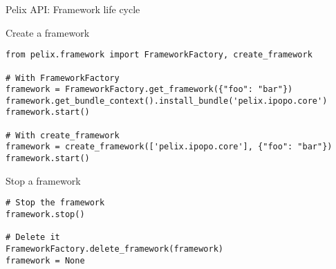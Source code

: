 \begin{frame}[fragile]{Pelix API: Framework life cycle}
\begin{block}{Create a framework}
\begin{verbatim}
from pelix.framework import FrameworkFactory, create_framework

# With FrameworkFactory
framework = FrameworkFactory.get_framework({"foo": "bar"})
framework.get_bundle_context().install_bundle('pelix.ipopo.core')
framework.start()

# With create_framework
framework = create_framework(['pelix.ipopo.core'], {"foo": "bar"})
framework.start()
\end{verbatim}
\end{block}

\begin{block}{Stop a framework}
\begin{verbatim}
# Stop the framework
framework.stop()

# Delete it
FrameworkFactory.delete_framework(framework)
framework = None
\end{verbatim}
\end{block}
\end{frame}

